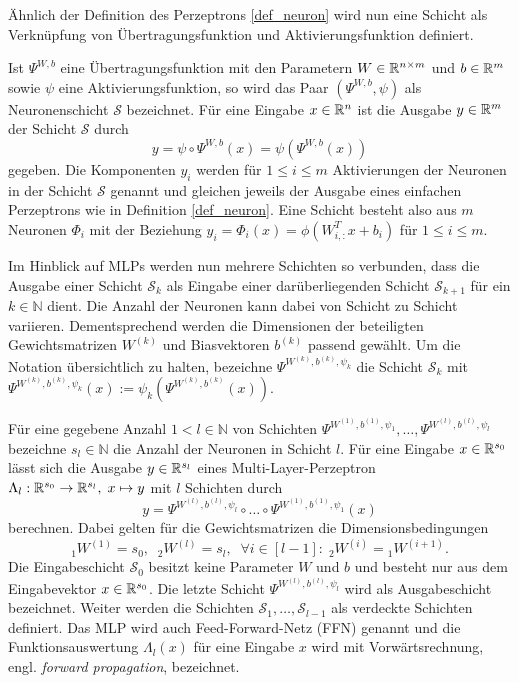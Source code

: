 Ähnlich der Definition des Perzeptrons \ref{def_neuron} wird nun eine Schicht als Verknüpfung von Übertragungsfunktion und Aktivierungsfunktion definiert.

\begin{defi}[Neuronenschicht]
    \label{def:NNlayer}
    Ist $\Psi^{W,b}$ eine Übertragungsfunktion mit den Parametern $W \in \mathbb{R}^{n \times m}$ und $b \in \mathbb{R}^m$ sowie $\psi$ eine Aktivierungsfunktion, so wird das Paar $(\Psi^{W,b}, \psi)$ als Neuronenschicht $\mathcal{S}$ bezeichnet. Für eine Eingabe $x \in \mathbb{R}^n$ ist die Ausgabe $y \in \mathbb{R}^m$ der Schicht $\mathcal{S}$ durch
    \[y=\psi \circ \Psi^{W,b}(x)= \psi\left(\Psi^{W,b}(x)\right)
        \] 
        gegeben. Die Komponenten $y_i$ werden für $1 \leq i \leq m$ Aktivierungen der Neuronen in der Schicht $\mathcal{S}$ genannt und gleichen jeweils der Ausgabe eines einfachen Perzeptrons wie in Definition \ref{def_neuron}. Eine Schicht besteht also aus $m$ Neuronen $\Phi_i$ mit der Beziehung $y_i=\Phi_i(x)=\phi(W_{i,:}^T x+b_i)$ für $1 \leq i \leq m$.
\end{defi}
Im Hinblick auf MLPs werden nun mehrere Schichten so verbunden, dass die Ausgabe einer Schicht $\mathcal{S}_k$ als Eingabe einer darüberliegenden Schicht $\mathcal{S}_{k+1}$ für ein $k \in \mathbb{N}$ dient. Die Anzahl der Neuronen kann dabei von Schicht zu Schicht variieren. Dementsprechend werden die Dimensionen der beteiligten Gewichtsmatrizen $W^{(k)}$ und Biasvektoren $b^{(k)}$ passend gewählt. 
Um die Notation übersichtlich zu halten, bezeichne $\Psi^{W^{(k)},b^{(k)},\psi_{k}}$ die Schicht $\mathcal{S}_k$ mit $\Psi^{W^{(k)},b^{(k)},\psi_{k}}(x):= \psi_{k} \left(\Psi^{W^{(k)},b^{(k)}}(x)\right)$.

\begin{defi}
    \label{def:MLP}
    Für eine gegebene Anzahl $1<l \in \mathbb{N}$ von Schichten $\Psi^{W^{(1)},b^{(1)},\psi_{1}}, \ldots, \Psi^{W^{(l)},b^{(l)},\psi_{l}}$ bezeichne $s_l \in \mathbb{N}$ die Anzahl der Neuronen in Schicht $l$. Für eine Eingabe $x \in \mathbb{R}^{s_0}$ lässt sich die Ausgabe $y \in \mathbb{R}^{s_l}$ eines Multi-Layer-Perzeptron  $\Lambda_l: \mathbb{R}^{s_0} \rightarrow \mathbb{R}^{s_l}, \; x \mapsto y$ mit $l$ Schichten durch
    \[
        y=\Psi^{W^{(l)},b^{(l)},\psi_{l}} \circ \ldots \circ \Psi^{W^{(1)},b^{(1)},\psi_{1}}(x)
    \]
    berechnen. Dabei gelten für die Gewichtsmatrizen die Dimensionsbedingungen
    \[{}_1W^{(1)}=s_0, \; \; {}_2W^{(l)}=s_l, \; \; \forall i \in [l-1]: \; {}_2W^{(i)}={}_1W^{(i+1)}.
        \] 
    Die Eingabeschicht $\mathcal{S}_0$ besitzt keine Parameter $W$ und $b$ und besteht nur aus dem Eingabevektor $x \in \mathbb{R}^{s_0}$. Die letzte Schicht $\Psi^{W^{(l)},b^{(l)},\psi_{l}}$ wird als Ausgabeschicht bezeichnet. Weiter werden die Schichten $\mathcal{S}_1, \ldots, \mathcal{S}_{l-1}$ als verdeckte Schichten definiert. Das MLP wird auch Feed-Forward-Netz (FFN)  genannt und die Funktionsauswertung $\Lambda_l(x)$ für eine Eingabe $x$ wird mit Vorwärtsrechnung, engl. \textit{forward propagation}, bezeichnet.
\end{defi}

